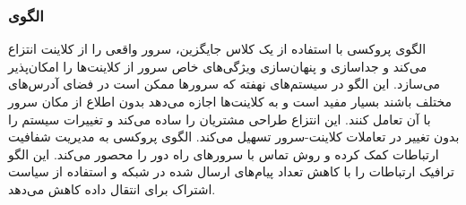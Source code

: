 \subsubsection{الگوی }
\label{distrProxySec}
\begin{RTL}
الگوی پروکسی با استفاده از یک کلاس جایگزین، سرور واقعی را از کلاینت
انتزاع می‌کند و جداسازی و پنهان‌سازی ویژگی‌های خاص سرور
از کلاینت‌ها را امکان‌پذیر می‌سازد. این الگو در سیستم‌های نهفته که
سرورها ممکن است در فضای آدرس‌های مختلف باشند بسیار مفید است
و به کلاینت‌ها اجازه می‌دهد بدون اطلاع از مکان سرور با آن تعامل کنند.
این انتزاع طراحی مشتریان را ساده می‌کند و تغییرات سیستم را بدون تغییر
در تعاملات کلاینت-سرور تسهیل می‌کند. الگوی پروکسی به مدیریت شفافیت
ارتباطات کمک کرده و روش تماس با سرورهای راه دور را محصور می‌کند.
این الگو ترافیک ارتباطات را با کاهش تعداد پیام‌های ارسال شده
در شبکه و استفاده از سیاست اشتراک برای انتقال داده کاهش می‌دهد.
\end{RTL}